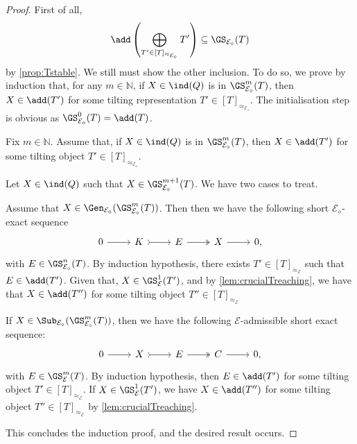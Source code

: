 \begin{proof}
First of all, \[\add\left(\bigoplus_{T' \in [T]_{\approx_{\mathcal{E}_\diamond}}} T' \right) \subseteq  \GS_{\mathcal{E}_\diamond}(T)\] by \cref{prop:Tstable}. We still must show the other inclusion. To do so, we prove by induction that, for any $m \in \mathbb{N}$, if $X \in \ind(Q)$ is in $\GS_{\mathcal{E}_\diamond}^m(T)$, then $X \in \add(T')$ for some tilting representation $T' \in [T]_{\approx_{\mathcal{E}_\diamond}}$. The initialisation step is obvious as $\GS^0_{\mathcal{E}_\diamond}(T) = \add(T)$. 

Fix $m \in \mathbb{N}$. Assume that, if $X \in \ind(Q)$ is in $\GS^m_{\mathcal{E}_\diamond}(T)$, then $X \in \add(T')$ for some tilting object $T' \in [T]_{\approx_{\mathcal{E}_\diamond}}$.

Let $X \in \ind(Q)$ such that $X \in \GS^{m+1}_{\mathcal{E}_\diamond}(T)$. We have two cases to treat. 

Assume that $X \in \Gen_{\mathcal{E}_\diamond}(\GS^{m}_{\mathcal{E}_\diamond}(T))$. Then then we have the following short $\mathcal{E}_\diamond$-exact sequence
\[\begin{tikzcd}
	0 & K & E  & X &  0,
	\arrow[from=1-1, to=1-2]
	\arrow[tail, from=1-2, to=1-3]
	\arrow[two heads,from=1-3, to=1-4]
	\arrow[from=1-4, to=1-5]
\end{tikzcd} \] with $E \in \GS^{n}_{\mathcal{E}_\diamond}(T)$. By induction hypothesis, there exists $T' \in [T]_{\approx_\mathcal{E}}$ such that $E \in \add(T')$. %
Given that, $X \in \GS^{1}_\mathcal{E}(T')$, and by \cref{lem:crucialTreaching}, we have that $X \in \add(T'')$ for some tilting object $T'' \in [T]_{\approx_\mathcal{E}}$ 

If $X \in \Sub_{\mathcal{E}_\diamond}(\GS^{m}_{\mathcal{E}_\diamond}(T))$, then we have the following $\mathcal{E}$-admissible short exact sequence:
\[\begin{tikzcd}
	0 & X & E  & C &  0,
	\arrow[from=1-1, to=1-2]
	\arrow[tail, from=1-2, to=1-3]
	\arrow[two heads,from=1-3, to=1-4]
	\arrow[from=1-4, to=1-5]
\end{tikzcd} \] with $E \in \GS^{m}_\mathcal{E}(T)$. By induction hypothesis, then $E \in \add(T')$ %
for some tilting object $T' \in [T]_{\approx_\mathcal{E}}$. If $X \in \GS^{1}_\mathcal{E}(T')$, we have $X \in \add(T'')$ for some tilting object $T'' \in [T]_{\approx_\mathcal{E}}$ by \cref{lem:crucialTreaching}. 

This concludes the induction proof, and the desired result occurs.
\end{proof}



